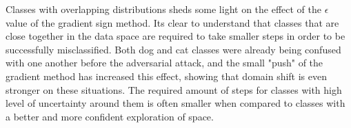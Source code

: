 Classes with overlapping distributions sheds some light on the effect of the $\epsilon$ value of the gradient sign method. Its clear to understand that classes that are close together in the data space are required to take smaller steps in order to be successfully misclassified. Both dog and cat classes were already being confused with one another before the adversarial attack, and the small "push" of the gradient method has increased this effect, showing that domain shift is even stronger on these situations. The required amount of steps for classes with high level of uncertainty around them is often smaller when compared to classes with a better and more confident exploration of space.